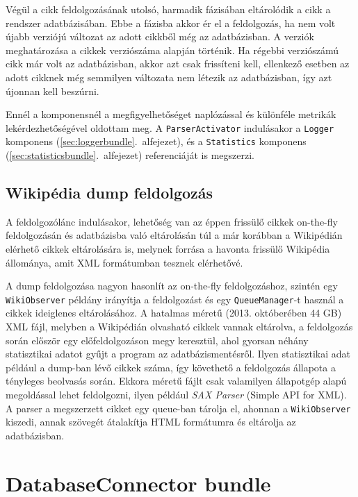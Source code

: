 Végül a cikk feldolgozásának utolsó, harmadik fázisában eltárolódik a cikk a rendszer adatbázisában. Ebbe a fázisba akkor ér el a feldolgozás, ha nem volt újabb verziójú változat az adott cikkből még az adatbázisban. A verziók meghatározása a cikkek verziószáma alapján történik. Ha régebbi verziószámú cikk már volt az adatbázisban, akkor azt csak frissíteni kell, ellenkező esetben az adott cikknek még semmilyen változata nem létezik az adatbázisban, így azt újonnan kell beszúrni.

Ennél a komponensnél a  megfigyelhetőséget naplózással és különféle metrikák lekérdezhetőségével oldottam meg. A \texttt{ParserActivator} indulásakor a \texttt{Logger} komponens (\ref{sec:loggerbundle}.~alfejezet), és a \texttt{Statistics} komponens (\ref{sec:statisticsbundle}.~alfejezet) referenciáját is megszerzi.

\subsection{Wikipédia dump feldolgozás}
\label{sub:dumpprocessing}

A feldolgozólánc indulásakor, lehetőség van az éppen frissülő cikkek on-the-fly feldolgozásán és adatbázisba való eltárolásán túl a már korábban a Wikipédián elérhető cikkek eltárolására is, melynek forrása a havonta frissülő Wikipédia állománya, amit XML formátumban tesznek elérhetővé.

A dump feldolgozása nagyon hasonlít az on-the-fly feldolgozáshoz, szintén egy \texttt{WikiObserver} példány irányítja a feldolgozást és egy \texttt{QueueManager}-t használ a cikkek ideiglenes eltárolásához. A hatalmas méretű (2013. októberében 44 GB) XML fájl, melyben a Wikipédián olvasható cikkek vannak eltárolva, a feldolgozás során először egy előfeldolgozáson megy keresztül, ahol gyorsan néhány statisztikai adatot gyűjt a program az adatbázismentésről. Ilyen statisztikai adat például a dump-ban lévő cikkek száma, így követhető a feldolgozás állapota a tényleges beolvasás során. Ekkora méretű fájlt csak valamilyen állapotgép alapú megoldással lehet feldolgozni, ilyen például \textit{SAX Parser} (Simple API for XML). A parser a megszerzett cikket egy queue-ban tárolja el, ahonnan a \texttt{WikiObserver} kiszedi, annak szövegét átalakítja HTML formátumra és eltárolja az adatbázisban.



\section{DatabaseConnector bundle}
\label{sec:dbconnectorbundle}
    
